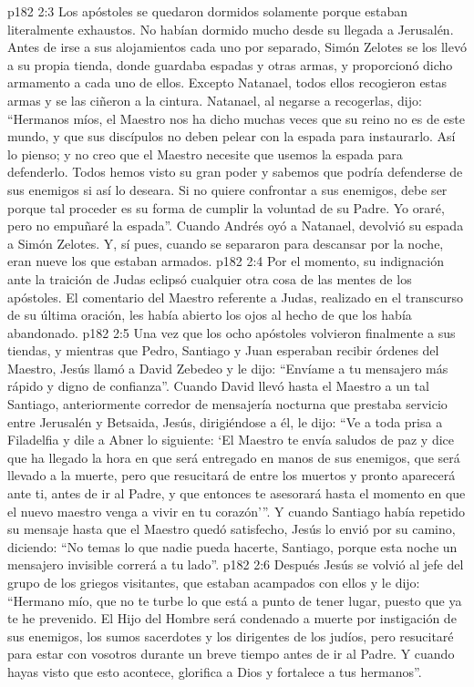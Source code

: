 \vs p182 2:3 Los apóstoles se quedaron dormidos solamente porque estaban literalmente exhaustos. No habían dormido mucho desde su llegada a Jerusalén. Antes de irse a sus alojamientos cada uno por separado, Simón Zelotes se los llevó a su propia tienda, donde guardaba espadas y otras armas, y proporcionó dicho armamento a cada uno de ellos. Excepto Natanael, todos ellos recogieron estas armas y se las ciñeron a la cintura. Natanael, al negarse a recogerlas, dijo: “Hermanos míos, el Maestro nos ha dicho muchas veces que su reino no es de este mundo, y que sus discípulos no deben pelear con la espada para instaurarlo. Así lo pienso; y no creo que el Maestro necesite que usemos la espada para defenderlo. Todos hemos visto su gran poder y sabemos que podría defenderse de sus enemigos si así lo deseara. Si no quiere confrontar a sus enemigos, debe ser porque tal proceder es su forma de cumplir la voluntad de su Padre. Yo oraré, pero no empuñaré la espada”. Cuando Andrés oyó a Natanael, devolvió su espada a Simón Zelotes. Y, sí pues, cuando se separaron para descansar por la noche, eran nueve los que estaban armados.
\vs p182 2:4 Por el momento, su indignación ante la traición de Judas eclipsó cualquier otra cosa de las mentes de los apóstoles. El comentario del Maestro referente a Judas, realizado en el transcurso de su última oración, les había abierto los ojos al hecho de que los había abandonado.
\vs p182 2:5 \pc Una vez que los ocho apóstoles volvieron finalmente a sus tiendas, y mientras que Pedro, Santiago y Juan esperaban recibir órdenes del Maestro, Jesús llamó a David Zebedeo y le dijo: “Envíame a tu mensajero más rápido y digno de confianza”. Cuando David llevó hasta el Maestro a un tal Santiago, anteriormente corredor de mensajería nocturna que prestaba servicio entre Jerusalén y Betsaida, Jesús, dirigiéndose a él, le dijo: “Ve a toda prisa a Filadelfia y dile a Abner lo siguiente: ‘El Maestro te envía saludos de paz y dice que ha llegado la hora en que será entregado en manos de sus enemigos, que será llevado a la muerte, pero que resucitará de entre los muertos y pronto aparecerá ante ti, antes de ir al Padre, y que entonces te asesorará hasta el momento en que el nuevo maestro venga a vivir en tu corazón’”. Y cuando Santiago había repetido su mensaje hasta que el Maestro quedó satisfecho, Jesús lo envió por su camino, diciendo: “No temas lo que nadie pueda hacerte, Santiago, porque esta noche un mensajero invisible correrá a tu lado”.
\vs p182 2:6 Después Jesús se volvió al jefe del grupo de los griegos visitantes, que estaban acampados con ellos y le dijo: “Hermano mío, que no te turbe lo que está a punto de tener lugar, puesto que ya te he prevenido. El Hijo del Hombre será condenado a muerte por instigación de sus enemigos, los sumos sacerdotes y los dirigentes de los judíos, pero resucitaré para estar con vosotros durante un breve tiempo antes de ir al Padre. Y cuando hayas visto que esto acontece, glorifica a Dios y fortalece a tus hermanos”.
